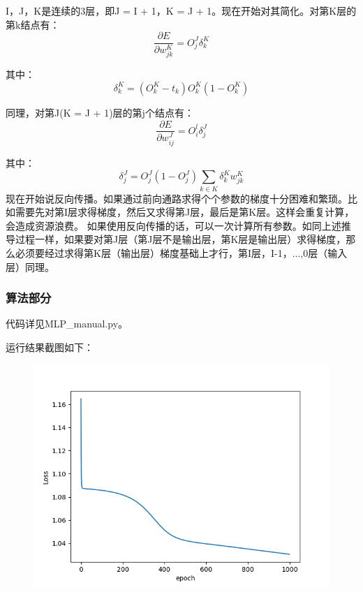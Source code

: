 \documentclass{ctexart}
\begin{document}
\par I，J，K是连续的3层，即J = I + 1，K = J + 1。现在开始对其简化。对第K层的第k结点有：
\begin{equation}
    \frac{\partial E}{\partial w_{j k}^{K}}=O_{j}^{J} \delta_{k}^{K}
    \end{equation}
\par 其中：
\begin{equation}
    \delta_{k}^{K}=\left(O_{k}^{K}-t_{k}\right) O_{k}^{K}\left(1-O_{k}^{K}\right)
    \end{equation}
\par 同理，对第J(K = J + 1)层的第j个结点有：
\begin{equation}
    \frac{\partial E}{\partial w_{i j}^{J}}=O_{i}^{l} \delta_{j}^{J}
    \end{equation}
\par 其中：
\begin{equation}
    \delta_{j}^{J}=O_{j}^{J}\left(1-O_{j}^{J}\right) \sum_{k \in K} \delta_{k}^{K}  w_{j k}^{K}
    \end{equation}
    现在开始说反向传播。如果通过前向通路求得个个参数的梯度十分困难和繁琐。比如需要先对第I层求得梯度，然后又求得第J层，最后是第K层。这样会重复计算，会造成资源浪费。
    如果使用反向传播的话，可以一次计算所有参数。如同上述推导过程一样，如果要对第J层（第J层不是输出层，第K层是输出层）求得梯度，那么必须要经过求得第K层（输出层）梯度基础上才行，第I层，I-1，...,0层（输入层）同理。
\subsubsection{\hei 算法部分}
代码详见MLP\_manual.py。
\par 运行结果截图如下：
\begin{figure}[htbp]
    \centering
    \includegraphics[scale=0.5]{Figure_1.png}

\end{figure}
\end{document}
